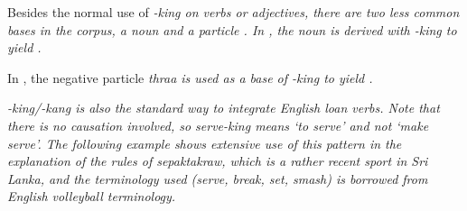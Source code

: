 Besides the normal use of \em -king \em on verbs or adjectives, there are two less common bases in the corpus, a noun  and a particle . In , the noun  is derived with \em -king \em to yield .





In , the negative particle \em thraa \em is used as a base of \em -king \em to yield .

 
\em -king/-kang \em is also the standard way to integrate English loan verbs. Note that there is no causation involved, so \em serve-king \em means `to serve' and not `make serve'. The following example shows extensive use of this pattern in the explanation of the rules of sepaktakraw, which is a rather recent sport in Sri Lanka, and the terminology used (serve, break, set, smash) is borrowed from English volleyball terminology.


